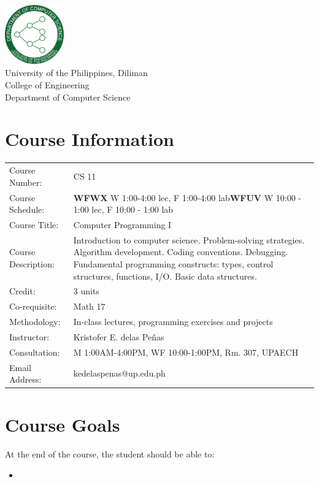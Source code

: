 \documentclass[9pt]{article}
\begin{document}
\thispagestyle{empty}
\begin{center}
	\includegraphics[width=1in]{UPD-DCS.png}\\\vspace{10pt}
	University of the Philippines, Diliman\\
	College of Engineering\\
	Department of Computer Science
\end{center}

\section*{Course Information}
\begin{center}
	\begin{tabular}{p{2in} p{3.5in}}
		Course Number: & CS 11\\
		Course Schedule: & \textbf{WFWX} W 1:00-4:00 lec, F 1:00-4:00 lab\newline\textbf{WFUV} W 10:00 - 1:00 lec, F 10:00 - 1:00 lab\\
		Course Title:	& Computer Programming I\\
		Course Description: & Introduction to computer science. Problem-solving strategies. Algorithm development. Coding conventions.
Debugging. Fundamental programming constructs: types, control structures, functions, I/O. Basic data structures.\\
		Credit: & 3 units\\
		Co-requisite: & Math 17\\
		Methodology: & In-class lectures, programming exercises and projects\\
		Instructor:	& Kristofer E. delas Pe\~nas\\
		Consultation: & M 1:00AM-4:00PM, WF 10:00-1:00PM, Rm. 307, UPAECH\\
		Email Address: & kedelaspenas@up.edu.ph\\
	\end{tabular}
\end{center}
\section*{Course Goals}
\paragraph{}
At the end of the course, the student should be able to:
\begin{itemize}
	\item 
\end{itemize}
\end{document}
